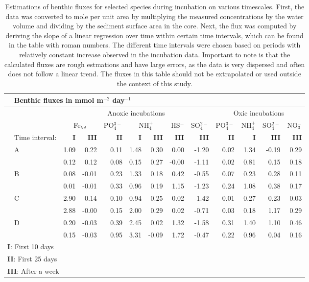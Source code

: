 \documentclass[a4paper,11pt]{article}
\begin{document}
\begin{table}[ht]
\centering
\begin{tabular}{rl|rrrrrrr||rrrr|}
  \toprule
  & \multicolumn{12}{l}{\textbf{Benthic fluxes in mmol m$^{-2}$ day$^{-1}$}} \\
  \hline
  & & \multicolumn{7}{c}{Anoxic incubations} & \multicolumn{4}{c}{Oxic incubations} \\
 &  &  \multicolumn{2}{c}{Fe$_{tot}$} & PO$_4^{3-}$ & \multicolumn{2}{c}{NH$_{4}^+$} & HS$^-$ & SO$_4^{2-}$ & 
 PO$_4^{3-}$ & NH$_{4}^+$ & SO$_4^{2-}$ & NO$_3^-$ \\ 
 & \footnotesize{Time interval:} & \textbf{I} & \textbf{III} & \textbf{II} & \textbf{I} & \textbf{III} & \textbf{III} & \textbf{III} & \textbf{II} & \textbf{I} & \textbf{III} & \textbf{III} \\
  \hline
& A & 1.09 & 0.22 & 0.11 & 1.48 & 0.30 & 0.00 & -1.20 & 0.02 & 1.34 & -0.19 & 0.29 \\ 
&  & 0.12 & 0.12 & 0.08 & 0.15 & 0.27 & -0.00 & -1.11 & 0.02 & 0.81 & 0.15 & 0.18 \\ \hline
& B & 0.08 & -0.01 & 0.23 & 1.33 & 0.18 & 0.42 & -0.55 & 0.07 & 0.23 & 0.28 & 0.11 \\ 
&  & 0.01 & -0.01 & 0.33 & 0.96 & 0.19 & 1.15 & -1.23 & 0.24 & 1.08 & 0.38 & 0.17 \\ \hline
& C & 2.90 & 0.14 & 0.10 & 0.94 & 0.25 & 0.02 & -1.42 & 0.01 & 0.27 & 0.23 & 0.03 \\ 
&  & 2.88 & -0.00 & 0.15 & 2.00 & 0.29 & 0.02 & -0.71 & 0.03 & 0.18 & 1.17 & 0.29 \\ \hline
& D & 0.20 & -0.03 & 0.39 & 2.45 & 0.02 & 1.32 & -1.58 & 0.31 & 1.40 & 1.10 & 0.46 \\ 
&  & 0.15 & -0.03 & 0.95 & 3.31 & -0.09 & 1.72 & -0.47 & 0.22 & 0.96 & 0.04 & 0.16 \\ 
   \hline
   \multicolumn{13}{l}{\footnotesize{\textbf{I}: First 10 days}} \\
   \multicolumn{13}{l}{\footnotesize{\textbf{II}: First 25 days}} \\
   \multicolumn{13}{l}{\footnotesize{\textbf{III}: After a week}} \\
   \bottomrule
\end{tabular}
\caption{Estimations of benthic fluxes for selected species during incubation on various timescales. First, the data was converted to mole per unit area by multiplying the measured concentrations by the water volume and dividing by the sediment surface area in the core. Next, the flux was computed by deriving the slope of a linear regression over time within certain time intervals, which can be found in the table with roman numbers. The different time intervals were chosen based on periods with relatively constant increase observed in the incubation data. Important to note is that the calculated fluxes are rough estmations and have large errors, as the data is very dispersed and often does not follow a linear trend. The fluxes in this table should not be extrapolated or used outside the context of this study.}
    \label{tab:flux}
\end{table}
\end{document}
